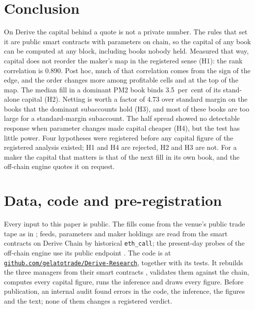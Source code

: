 \documentclass[a4paper,fleqn]{cas-dc}
\begin{document}
\section{Conclusion}\label{sec:conclusion}
On Derive the capital behind a quote is not a private number. The rules that set it are public smart contracts
with parameters on chain, so the capital of any book can be computed at any block, including books nobody held.
Measured that way, capital does not reorder the maker's map in the registered sense (H1): the rank correlation
is 0.890. Post hoc, much of that correlation comes from the sign of the edge, and the order changes more among
profitable cells and at the top of the map. The median fill in a dominant PM2 book binds 3.5~per~cent of its
stand-alone capital (H2). Netting is worth a factor of 4.73 over standard margin on the books that the dominant
subaccounts hold (H3), and most of these books are too large for a standard-margin subaccount. The half spread
showed no detectable response when parameter changes made capital cheaper (H4), but the test has little power.
Four hypotheses were registered before any capital figure of the registered analysis existed; H1 and H4 are
rejected, H2 and H3 are not. For a maker the capital that matters is that of the next fill in its own book, and
the off-chain engine quotes it on request.

\section*{Data, code and pre-registration}
Every input to this paper is public. The fills come from the venue's public trade tape as in
\citet{albiez2026}; feeds, parameters and maker holdings are read from the smart contracts on Derive Chain by
historical \texttt{eth\_call}; the present-day probes of the off-chain engine use its public endpoint
\citep{derivegetmargin}. The code is at
\href{https://github.com/gelatotrade/Derive-Research}{\nolinkurl{github.com/gelatotrade/Derive-Research}}, together
with its tests. It rebuilds the three managers from their smart contracts \citep{derivev2core}, validates them
against the chain, computes every capital figure, runs the inference and draws every figure. Before
publication, an internal audit found errors in the code, the inference, the figures and the text; none of
them changes a registered verdict.
\end{document}
